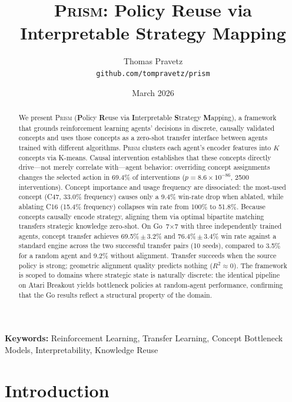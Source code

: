 \documentclass[11pt,a4paper]{article}
\title{
\textbf{\textsc{Prism}: Policy Reuse via Interpretable Strategy Mapping}
}
\author{
Thomas Pravetz\\
\texttt{github.com/tompravetz/prism}
}
\date{March 2026}
\newcommand{\prism}{\textsc{Prism}}
\begin{document}
\maketitle

\begin{abstract}
We present \prism{} (\textbf{P}olicy \textbf{R}euse via \textbf{I}nterpretable \textbf{S}trategy \textbf{M}apping), a framework that grounds reinforcement learning agents' decisions in discrete, causally validated concepts and uses those concepts as a zero-shot transfer interface between agents trained with different algorithms. \prism{} clusters each agent's encoder features into $K$ concepts via K-means. Causal intervention establishes that these concepts directly drive---not merely correlate with---agent behavior: overriding concept assignments changes the selected action in 69.4\% of interventions ($p = 8.6 \times 10^{-86}$, 2500 interventions). Concept importance and usage frequency are dissociated: the most-used concept (C47, 33.0\% frequency) causes only a 9.4\% win-rate drop when ablated, while ablating C16 (15.4\% frequency) collapses win rate from 100\% to 51.8\%. Because concepts causally encode strategy, aligning them via optimal bipartite matching transfers strategic knowledge zero-shot. On Go~7$\times$7 with three independently trained agents, concept transfer achieves 69.5\%\,$\pm$\,3.2\% and 76.4\%\,$\pm$\,3.4\% win rate against a standard engine across the two successful transfer pairs (10 seeds), compared to 3.5\% for a random agent and 9.2\% without alignment. Transfer succeeds when the source policy is strong; geometric alignment quality predicts nothing ($R^2 \approx 0$). The framework is scoped to domains where strategic state is naturally discrete: the identical pipeline on Atari Breakout yields bottleneck policies at random-agent performance, confirming that the Go results reflect a structural property of the domain.
\end{abstract}

\textbf{Keywords:} Reinforcement Learning, Transfer Learning, Concept Bottleneck Models, Interpretability, Knowledge Reuse

\section{Introduction}
\end{document}
